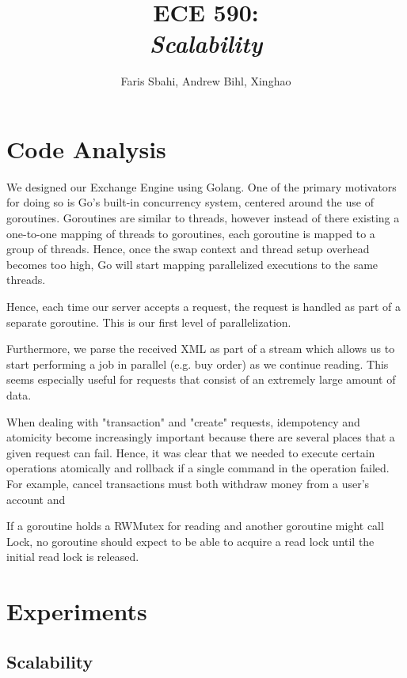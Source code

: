 \documentclass[titlepage, 11pt]{article}
\title{ECE 590: \\\textit{Scalability}}
\author{Faris Sbahi, Andrew Bihl, Xinghao}
\newcommand\0{\mathbf{0}}
\newcommand\<{\langle}
\renewcommand\>{\rangle}
\begin{document}
\maketitle

\section{Code Analysis}

We designed our Exchange Engine using Golang. One of the primary motivators for doing so is Go's built-in concurrency system, centered around the use of goroutines. Goroutines are similar to threads, however instead of there existing a one-to-one mapping of threads to goroutines, each goroutine is mapped to a group of threads. Hence, once the swap context and thread setup overhead becomes too high, Go will start mapping parallelized executions to the same threads.

Hence, each time our server accepts a request, the request is handled as part of a separate goroutine. This is our first level of parallelization. 

Furthermore, we parse the received XML as part of a stream which allows us to start performing a job in parallel (e.g. buy order) as we continue reading. This seems especially useful for requests that consist of an extremely large amount of data.

When dealing with "transaction" and "create" requests, idempotency and atomicity become increasingly important because there are several places that a given request can fail. Hence, it was clear that we needed to execute certain operations atomically and rollback if a single command in the operation failed. For example, cancel transactions must both withdraw money from a user's account and

If a goroutine holds a RWMutex for reading and another goroutine might call Lock, no goroutine should expect to be able to acquire a read lock until the initial read lock is released.

\section{Experiments}


\subsection{Scalability}
\end{document}
